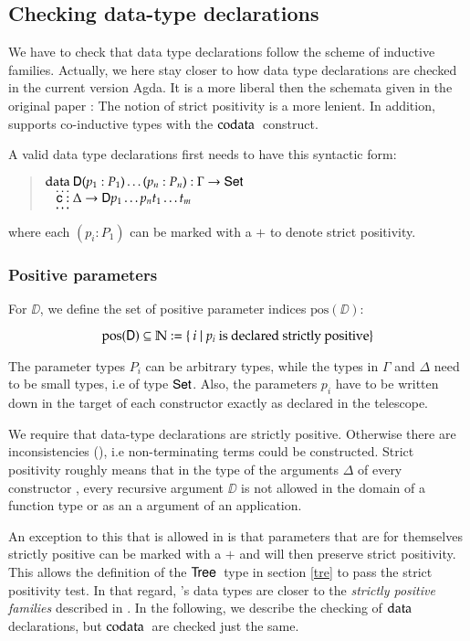 \subsection{Checking data-type declarations}
We have to check that data type declarations follow the scheme of inductive families.
Actually, we here stay closer to how data type declarations are checked in the current version Agda.
It is a more liberal then the schemata given in the original paper \cite{dybjer94inductive}: The notion of strict positivity is a more lenient. In addition, \mugda supports co-inductive types with the $\mathrm{codata}\:$ construct.

\noindent A valid data type declarations first needs to have this syntactic form:
\begin{quote}
$\mathrm{data}\: \mathsf{D} ( p_1 : P_1) \ldots ( p_n : P_n) : \Gamma \rightarrow \mathsf{Set} $\\
$\hspace*{3mm} \ldots$\\
$\hspace*{3mm} \mathsf{c} : \Delta \rightarrow \mathsf{D} p_1 \ldots p_n t_1 \ldots t_m$\\
$\hspace*{3mm} \ldots$\\   
\end{quote}
\newcommand{\pos}{\mbox{pos}}
where each $(p_i : P_1) $ can be marked with a $+$ to denote strict positivity.
\subsubsection{Positive parameters}
For $\DD$, we define the set of positive parameter indices $\pos(\DD)$:

\[\pos(\DD) \subseteq \cN := \{ \: i \mid p_i \mbox{ is declared strictly positive} \}\]

The parameter types $P_i$ can be arbitrary types, while the types in $\Gamma$ and $\Delta$ need to be small types, i.e of type $\mathsf{Set}$. Also, the parameters $p_i$ have to be written down in the target of each constructor exactly as declared in the telescope.

We require that data-type declarations are strictly positive.
Otherwise there are inconsistencies (\cite{paulinmohring93inductive}), i.e non-terminating terms could be constructed.
Strict positivity roughly means that in the type of the arguments $\Delta$ of every constructor , every recursive argument $\DD$ is not allowed in the domain of a function type or as an a argument of an application.

An exception to this that is allowed in \mugda is that parameters that are for themselves strictly positive can be marked with a $+$ and will then preserve strict positivity. 
This allows the definition of the $\mathsf{Tree}\:$ type in section \ref{tre} to pass the strict positivity test. In that regard, \mugda 's data types are closer to the \emph{strictly positive families} described in \cite{alti:cats07}.
In the following, we describe the checking of $\mathrm{data}\:$ declarations, but $\mathrm{codata}\:$ are checked just the same.


